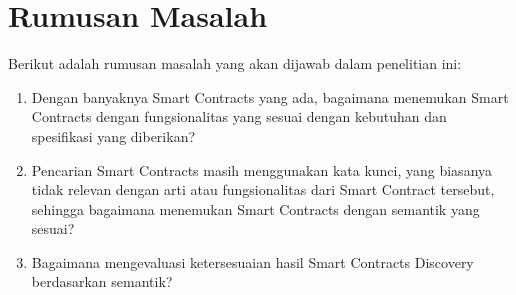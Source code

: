\section{Rumusan Masalah}
\label{sec:rumusan-masalah}

Berikut adalah rumusan masalah yang akan dijawab dalam penelitian ini:
\begin{enumerate}
  \item Dengan banyaknya Smart Contracts yang ada, bagaimana menemukan Smart Contracts dengan fungsionalitas yang sesuai dengan kebutuhan dan spesifikasi yang diberikan?
  \item Pencarian Smart Contracts masih menggunakan kata kunci, yang biasanya tidak relevan dengan arti atau fungsionalitas dari Smart Contract tersebut, sehingga bagaimana menemukan Smart Contracts dengan semantik yang sesuai?
  \item Bagaimana mengevaluasi ketersesuaian hasil Smart Contracts Discovery berdasarkan semantik?
\end{enumerate}



